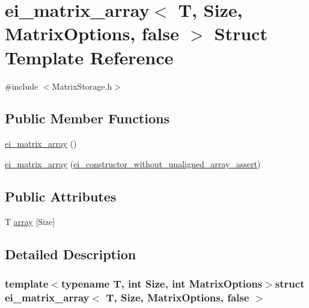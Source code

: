 \hypertarget{structei__matrix__array_3_01_t_00_01_size_00_01_matrix_options_00_01false_01_4}{\section{ei\-\_\-matrix\-\_\-array$<$ T, Size, Matrix\-Options, false $>$ Struct Template Reference}
\label{structei__matrix__array_3_01_t_00_01_size_00_01_matrix_options_00_01false_01_4}
}


{\ttfamily \#include $<$Matrix\-Storage.\-h$>$}

\subsection*{Public Member Functions}
\begin{DoxyCompactItemize}
\item 
\hyperlink{structei__matrix__array_3_01_t_00_01_size_00_01_matrix_options_00_01false_01_4_ada1b5fe7db6c4a596a0b0264e355f9fc}{ei\-\_\-matrix\-\_\-array} ()
\item 
\hyperlink{structei__matrix__array_3_01_t_00_01_size_00_01_matrix_options_00_01false_01_4_af0240a56c431390f536cfcce283b38c1}{ei\-\_\-matrix\-\_\-array} (\hyperlink{structei__constructor__without__unaligned__array__assert}{ei\-\_\-constructor\-\_\-without\-\_\-unaligned\-\_\-array\-\_\-assert})
\end{DoxyCompactItemize}
\subsection*{Public Attributes}
\begin{DoxyCompactItemize}
\item 
T \hyperlink{structei__matrix__array_3_01_t_00_01_size_00_01_matrix_options_00_01false_01_4_ab9ebb6369149c1a1da6be650e1dd57eb}{array} \mbox{[}Size\mbox{]}
\end{DoxyCompactItemize}


\subsection{Detailed Description}
\subsubsection*{template$<$typename T, int Size, int Matrix\-Options$>$struct ei\-\_\-matrix\-\_\-array$<$ T, Size, Matrix\-Options, false $>$}



